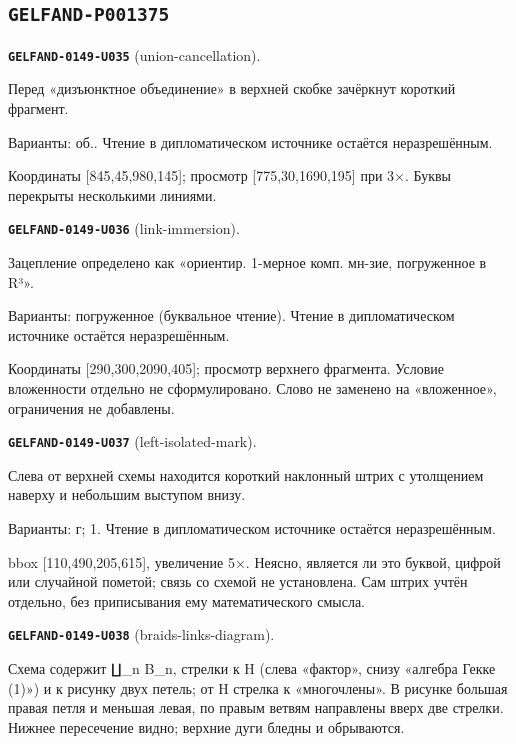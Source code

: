 \documentclass[11pt]{article}
\theoremstyle{definition}
\theoremstyle{remark}
\begin{document}
\subsection*{\texttt{GELFAND-P001375}}
\noindent\leavevmode{}\label{GELFAND-P001375:union-cancellation:note}\textbf{\texttt{GELFAND-0149-U035}} (union-cancellation).\par\nopagebreak[4]
Перед «дизъюнктное объединение» в верхней скобке зачёркнут короткий фрагмент.\par
Варианты: об.. Чтение в дипломатическом источнике остаётся неразрешённым.\par
Координаты [845,45,980,145]; просмотр [775,30,1690,195] при 3×. Буквы перекрыты несколькими линиями.\par\medskip
\noindent\leavevmode{}\label{GELFAND-P001375:link-immersion:note}\textbf{\texttt{GELFAND-0149-U036}} (link-immersion).\par\nopagebreak[4]
Зацепление определено как «ориентир. 1-мерное комп. мн-зие, погруженное в R³».\par
Варианты: погруженное (буквальное чтение). Чтение в дипломатическом источнике остаётся неразрешённым.\par
Координаты [290,300,2090,405]; просмотр верхнего фрагмента. Условие вложенности отдельно не сформулировано. Слово не заменено на «вложенное», ограничения не добавлены.\par\medskip
\noindent\leavevmode{}\label{GELFAND-P001375:left-isolated-mark:note}\textbf{\texttt{GELFAND-0149-U037}} (left-isolated-mark).\par\nopagebreak[4]
Слева от верхней схемы находится короткий наклонный штрих с утолщением наверху и небольшим выступом внизу.\par
Варианты: г; 1. Чтение в дипломатическом источнике остаётся неразрешённым.\par
bbox [110,490,205,615], увеличение 5×. Неясно, является ли это буквой, цифрой или случайной пометой; связь со схемой не установлена. Сам штрих учтён отдельно, без приписывания ему математического смысла.\par\medskip
\noindent\leavevmode{}\label{GELFAND-P001375:braids-links-diagram:note}\textbf{\texttt{GELFAND-0149-U038}} (braids-links-diagram).\par\nopagebreak[4]
Схема содержит ∐\_n B\_n, стрелки к H (слева «фактор», снизу «алгебра Гекке (1)») и к рисунку двух петель; от H стрелка к «многочлены». В рисунке большая правая петля и меньшая левая, по правым ветвям направлены вверх две стрелки. Нижнее пересечение видно; верхние дуги бледны и обрываются.\par
\end{document}
